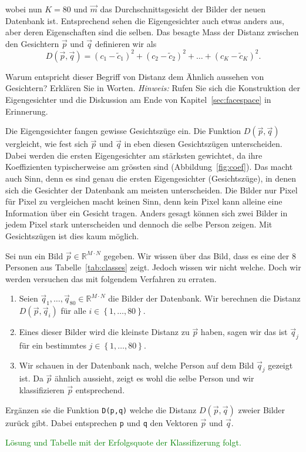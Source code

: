 wobei nun $K=80$ und $\vec m$ das Durchschnittsgesicht der Bilder der neuen Datenbank ist.
Entsprechend sehen die Eigengesichter auch etwas anders aus, aber deren Eigenschaften sind die selben.
Das besagte Mass der Distanz zwischen den Gesichtern $\vec p$ und $\vec q$ definieren wir als
\begin{equation*}
	D\left(\vec p,\vec q\right)=\left(c_1-\tilde c_1\right)^2+\left(c_2-\tilde c_2\right)^2+\ldots+\left(c_K-\tilde c_K\right)^2.
\end{equation*}
\begin{aufgabe}
	Warum entspricht dieser Begriff von Distanz dem \glqq{}Ähnlich aussehen\grqq{} von Gesichtern?
	Erklären Sie in Worten.
	\textit{Hinweis:} Rufen Sie sich die Konstruktion der Eigengesichter und die Diskussion am Ende von Kapitel~\ref{sec:facespace} in Erinnerung.
\end{aufgabe}
\begin{losung*}
	Die Eigengesichter fangen gewisse Gesichtszüge ein.
	Die Funktion $D\left(\vec p,\vec q\right)$ vergleicht, wie fest sich $\vec p$ und $\vec q$ in eben diesen Gesichtszügen unterscheiden.
	Dabei werden die ersten Eigengesichter am stärksten gewichtet, da ihre Koeffizienten typischerweise am grössten sind (Abbildung~\ref{fig:coef}).
	Das macht auch Sinn, denn es sind genau die ersten Eigengesichter (Gesichtszüge), in denen sich die Gesichter der Datenbank am meisten unterscheiden.
	Die Bilder nur Pixel für Pixel zu vergleichen macht keinen Sinn, denn kein Pixel kann alleine eine Information über ein Gesicht tragen.
	Anders gesagt können sich zwei Bilder in jedem Pixel stark unterscheiden und dennoch die selbe Person zeigen.
	Mit Gesichtszügen ist dies kaum möglich.
\end{losung*}
Sei nun ein Bild $\vec p\in\mathbb R^{M\cdot N}$ gegeben.
Wir wissen über das Bild, dass es eine der 8 Personen aus Tabelle~\ref{tab:classes} zeigt.
Jedoch wissen wir nicht welche.
Doch wir werden versuchen das mit folgendem Verfahren zu erraten.
\begin{enumerate}[leftmargin=3cm, label=Schritt \arabic*:]
	\item Seien $\vec q_1,\ldots,\vec q_{80}\in\mathbb R^{M\cdot N}$ die Bilder der Datenbank.
	Wir berechnen die Distanz $D\left(\vec p,\vec q_i\right)$ für alle $i\in\left\{1,\ldots,80\right\}$.
	\item Eines dieser Bilder wird die kleinste Distanz zu $\vec p$ haben, sagen wir das ist $\vec q_j$ für ein bestimmtes $j\in\left\{1,\ldots,80\right\}$.
	\item Wir schauen in der Datenbank nach, welche Person auf dem Bild $\vec q_j$ gezeigt ist. Da $\vec p$ ähnlich aussieht, zeigt es wohl die selbe Person und wir klassifizieren $\vec p$ entsprechend.
\end{enumerate}
\begin{aufgabe}
	Ergänzen sie die Funktion \texttt{D(p,q)} welche die Distanz $D\left(\vec p,\vec q\right)$ zweier Bilder zurück gibt.
	Dabei entsprechen \texttt{p} und \texttt{q} den Vektoren $\vec p$ und $\vec q$.
\end{aufgabe}
\textcolor{green}{Lösung und Tabelle mit der \glqq{}Erfolgsquote\grqq{} der Klassifizerung folgt.}